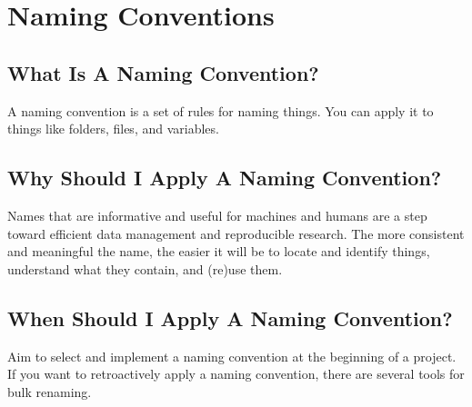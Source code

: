 \documentclass[
  letterpaper,
  DIV=11,
  numbers=noendperiod]{scrreprt}
\begin{document}

\hypertarget{naming-conventions}{%
\chapter*{Naming Conventions}\label{naming-conventions}}


\hypertarget{what-is-a-naming-convention}{%
\section*{What Is A Naming
Convention?}\label{what-is-a-naming-convention}}


A naming convention is a set of rules for naming things. You can apply
it to things like folders, files, and variables.

\hypertarget{why-should-i-apply-a-naming-convention}{%
\section*{Why Should I Apply A Naming
Convention?}\label{why-should-i-apply-a-naming-convention}}


Names that are informative and useful for machines and humans are a step
toward efficient data management and reproducible research. The more
consistent and meaningful the name, the easier it will be to locate and
identify things, understand what they contain, and (re)use them.

\hypertarget{when-should-i-apply-a-naming-convention}{%
\section*{When Should I Apply A Naming
Convention?}\label{when-should-i-apply-a-naming-convention}}


Aim to select and implement a naming convention at the beginning of a
project. If you want to retroactively apply a naming convention, there
are several tools for bulk renaming.
\end{document}
